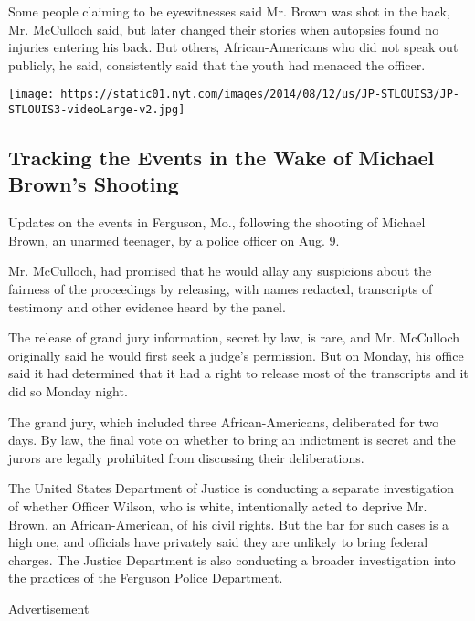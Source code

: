 Some people claiming to be eyewitnesses said Mr. Brown was shot in the
back, Mr. McCulloch said, but later changed their stories when autopsies
found no injuries entering his back. But others, African-Americans who
did not speak out publicly, he said, consistently said that the youth
had menaced the officer.

\href{https://www.nytimes.com/interactive/2014/11/09/us/10ferguson-michael-brown-shooting-grand-jury-darren-wilson.html}{}

\texttt{[image: https://static01.nyt.com/images/2014/08/12/us/JP-STLOUIS3/JP-STLOUIS3-videoLarge-v2.jpg]}

\hypertarget{tracking-the-events-in-the-wake-of-michael-browns-shooting}{%
\subsection{Tracking the Events in the Wake of Michael Brown's
Shooting}\label{tracking-the-events-in-the-wake-of-michael-browns-shooting}}

Updates on the events in Ferguson, Mo., following the shooting of
Michael Brown, an unarmed teenager, by a police officer on Aug. 9.

Mr. McCulloch, had promised that he would allay any suspicions about the
fairness of the proceedings by releasing, with names redacted,
transcripts of testimony and other evidence heard by the panel.

The release of grand jury information, secret by law, is rare, and Mr.
McCulloch originally said he would first seek a judge's permission. But
on Monday, his office said it had determined that it had a right to
release most of the transcripts and it did so Monday night.

The grand jury, which included three African-Americans, deliberated for
two days. By law, the final vote on whether to bring an indictment is
secret and the jurors are legally prohibited from discussing their
deliberations.

The United States Department of Justice is conducting a separate
investigation of whether Officer Wilson, who is white, intentionally
acted to deprive Mr. Brown, an African-American, of his civil rights.
But the bar for such cases is a high one, and officials have privately
said they are unlikely to bring federal charges. The Justice Department
is also conducting a broader investigation into the practices of the
Ferguson Police Department.

Advertisement

